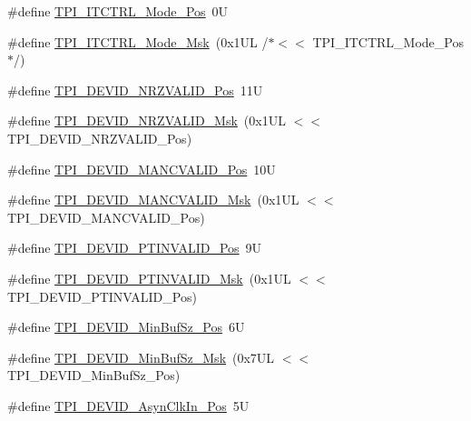 \begin{DoxyCompactItemize}
\item 
\#define \hyperlink{group___c_m_s_i_s___t_p_i_gaa847adb71a1bc811d2e3190528f495f0}{T\-P\-I\-\_\-\-I\-T\-C\-T\-R\-L\-\_\-\-Mode\-\_\-\-Pos}~0\-U
\item 
\#define \hyperlink{group___c_m_s_i_s___t_p_i_gad6f87550b468ad0920d5f405bfd3f017}{T\-P\-I\-\_\-\-I\-T\-C\-T\-R\-L\-\_\-\-Mode\-\_\-\-Msk}~(0x1\-U\-L /$\ast$$<$$<$ T\-P\-I\-\_\-\-I\-T\-C\-T\-R\-L\-\_\-\-Mode\-\_\-\-Pos$\ast$/)
\item 
\#define \hyperlink{group___c_m_s_i_s___t_p_i_ga9f46cf1a1708575f56d6b827766277f4}{T\-P\-I\-\_\-\-D\-E\-V\-I\-D\-\_\-\-N\-R\-Z\-V\-A\-L\-I\-D\-\_\-\-Pos}~11\-U
\item 
\#define \hyperlink{group___c_m_s_i_s___t_p_i_gacecc8710a8f6a23a7d1d4f5674daf02a}{T\-P\-I\-\_\-\-D\-E\-V\-I\-D\-\_\-\-N\-R\-Z\-V\-A\-L\-I\-D\-\_\-\-Msk}~(0x1\-U\-L $<$$<$ T\-P\-I\-\_\-\-D\-E\-V\-I\-D\-\_\-\-N\-R\-Z\-V\-A\-L\-I\-D\-\_\-\-Pos)
\item 
\#define \hyperlink{group___c_m_s_i_s___t_p_i_ga675534579d9e25477bb38970e3ef973c}{T\-P\-I\-\_\-\-D\-E\-V\-I\-D\-\_\-\-M\-A\-N\-C\-V\-A\-L\-I\-D\-\_\-\-Pos}~10\-U
\item 
\#define \hyperlink{group___c_m_s_i_s___t_p_i_ga4c3ee4b1a34ad1960a6b2d6e7e0ff942}{T\-P\-I\-\_\-\-D\-E\-V\-I\-D\-\_\-\-M\-A\-N\-C\-V\-A\-L\-I\-D\-\_\-\-Msk}~(0x1\-U\-L $<$$<$ T\-P\-I\-\_\-\-D\-E\-V\-I\-D\-\_\-\-M\-A\-N\-C\-V\-A\-L\-I\-D\-\_\-\-Pos)
\item 
\#define \hyperlink{group___c_m_s_i_s___t_p_i_ga974cccf4c958b4a45cb71c7b5de39b7b}{T\-P\-I\-\_\-\-D\-E\-V\-I\-D\-\_\-\-P\-T\-I\-N\-V\-A\-L\-I\-D\-\_\-\-Pos}~9\-U
\item 
\#define \hyperlink{group___c_m_s_i_s___t_p_i_ga1ca84d62243e475836bba02516ba6b97}{T\-P\-I\-\_\-\-D\-E\-V\-I\-D\-\_\-\-P\-T\-I\-N\-V\-A\-L\-I\-D\-\_\-\-Msk}~(0x1\-U\-L $<$$<$ T\-P\-I\-\_\-\-D\-E\-V\-I\-D\-\_\-\-P\-T\-I\-N\-V\-A\-L\-I\-D\-\_\-\-Pos)
\item 
\#define \hyperlink{group___c_m_s_i_s___t_p_i_ga3f7da5de2a34be41a092e5eddd22ac4d}{T\-P\-I\-\_\-\-D\-E\-V\-I\-D\-\_\-\-Min\-Buf\-Sz\-\_\-\-Pos}~6\-U
\item 
\#define \hyperlink{group___c_m_s_i_s___t_p_i_ga939e068ff3f1a65b35187ab34a342cd8}{T\-P\-I\-\_\-\-D\-E\-V\-I\-D\-\_\-\-Min\-Buf\-Sz\-\_\-\-Msk}~(0x7\-U\-L $<$$<$ T\-P\-I\-\_\-\-D\-E\-V\-I\-D\-\_\-\-Min\-Buf\-Sz\-\_\-\-Pos)
\item 
\#define \hyperlink{group___c_m_s_i_s___t_p_i_gab382b1296b5efd057be606eb8f768df8}{T\-P\-I\-\_\-\-D\-E\-V\-I\-D\-\_\-\-Asyn\-Clk\-In\-\_\-\-Pos}~5\-U

\end{DoxyCompactItemize}
